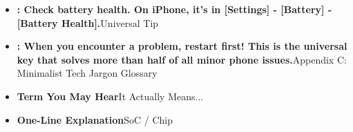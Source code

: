 
\begin{itemize}
  \item \textbf{: Check battery health. On iPhone, it's in [Settings] - [Battery] - [Battery Health].}Universal Tip
  \item \textbf{: When you encounter a problem, restart first! This is the universal key that solves more than half of all minor phone issues.}Appendix C: Minimalist Tech Jargon Glossary
  \item \textbf{Term You May Hear}It Actually Means...
  \item \textbf{One-Line Explanation}SoC / Chip
\end{itemize}
